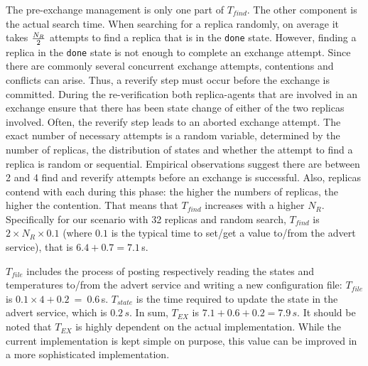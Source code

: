 \documentclass{rspublic}
\newcommand{\alnote}[1]{ {\textcolor{blue} { ***andre: #1 }}}
\newcommand{\alnote}[1]{}
\begin{document}


The pre-exchange management is only one part of $T_{find}$. The other 
component is the actual search time. When searching for a replica randomly,
on average it takes $N_R \over 2$ attempts to find a replica that is
in the \texttt{done} state.  However, finding a replica in the
\texttt{done} state is not enough to complete an exchange attempt.
Since there are commonly several concurrent exchange attempts,
contentions and conflicts can arise. Thus, a reverify step must occur before
the exchange is committed. During the re-verification both replica-agents
that are involved in an exchange ensure that there has been state change 
of either of the two replicas involved.  Often, the reverify step leads 
to an aborted exchange attempt. The exact number of necessary attempts is a
random variable, determined by the number of replicas, the
distribution of states and whether the attempt to find a replica is
random or sequential. Empirical observations suggest there are between 2 and 4
find and reverify attempts before an exchange is successful.  
Also, replicas contend with each during this phase: the higher the numbers of replicas,
the higher the contention. That means that $T_{find}$ increases with a higher $N_R$. 
Specifically for our scenario with 32 replicas and random search, $T_{find}$ is 
$2 \times N_R \times 0.1$ (where $0.1$ is the typical time to set/get a value 
to/from the advert service), that is $6.4+0.7=7.1$\,s.

$T_{file}$ includes the process of posting respectively reading the states 
and temperatures to/from the advert service and writing a new configuration 
file: $T_{file}$ is $0.1\times 4 +0.2~=~0.6$\,s. %
$T_{state}$ is the time required to update the state in the advert
service, which is $0.2\,s$.  In sum, $T_{EX}$ is $7.1+0.6 +0.2=
7.9\,s$.  It should be noted that $T_{EX}$ is highly dependent on
the actual implementation. While the current implementation is kept
simple on purpose, this value can be improved in a more sophisticated 
implementation.
\end{document}
